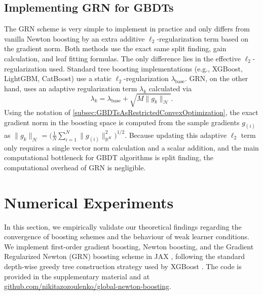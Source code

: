 \documentclass{article}
\theoremstyle{plain}
\theoremstyle{definition}
\theoremstyle{remark}
\begin{document}
\subsection{Implementing GRN for GBDTs}
The GRN scheme is very simple to implement in practice and only differs from vanilla Newton boosting by an extra additive $\ell_2$-regularization term based on the gradient norm. Both methods use the exact same split finding, gain calculation, and leaf fitting formulas. The only difference lies in the effective $\ell_2$-regularization used. Standard tree boosting implementations (e.g., XGBoost, LightGBM, CatBoost) use a static $\ell_2$-regularization $\lambda_{\text{base}}$. GRN, on the other hand, uses an adaptive regularization term $\lambda_k$ calculated via
\begin{equation}
    \lambda_k = \lambda_{\text{base}} + \sqrt{M \|g_k\|_{\mathcal{H}}}.
\end{equation}
Using the notation of \cref{subsec:GBDTsAsRestrictedConvexOptimization}, the exact gradient norm in the boosting space is computed from the sample gradients $g_{(i)}$ as $\|g_k\|_{\mathcal{H}} = \big(\frac{1}{N}\sum_{i=1}^N \|g_{(i)}\|^2_{\mathbb{R}^K}\big)^{1/2}$. Because updating this adaptive $\ell_2$ term only requires a single vector norm calculation and a scalar addition, and the main computational bottleneck for GBDT algorithms is split finding, the computational overhead of GRN is negligible.


\section{Numerical Experiments}\label{secNumericalResults}
In this section, we empirically validate our theoretical findings regarding the convergence of boosting schemes and the behaviour of weak learner conditions. We implement first-order gradient boosting, Newton boosting, and the Gradient Regularized Newton (GRN) boosting scheme in JAX \cite{2018jaxGithub}, following the standard depth-wise greedy tree construction strategy used by XGBoost \cite{2016XGBoost}. The code is provided in the supplementary material and at \url{github.com/nikitazozoulenko/global-newton-boosting}.
\end{document}
